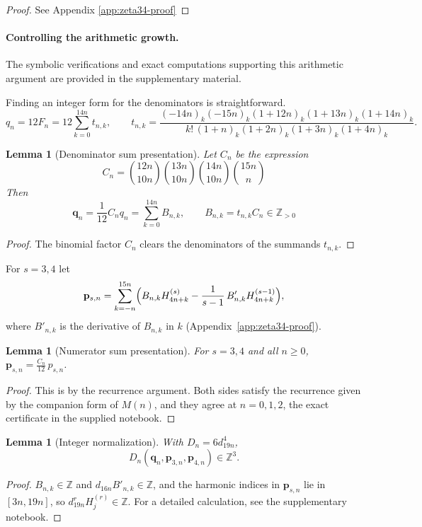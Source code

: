 \documentclass[oneside,english,11pt]{amsart}
\newtheorem{lemma}[thm]{Lemma}
\begin{document}
\begin{proof}
See Appendix \ref{app:zeta34-proof}
\end{proof}
%
\paragraph{Controlling the arithmetic growth.}
\label{par: gcd z34}
The symbolic verifications and exact computations supporting this arithmetic argument are provided in the supplementary material.

Finding an integer form for the denominators is straightforward.
\[
q_n=12F_n = 12\sum_{k=0}^{14n}t_{n,k},\qquad  
t_{n,k}=\frac{(-14n)_k(-15n)_k(1+12n)_k(1+13n)_k(1+14n)_k}{k!\,(1+n)_k(1+2n)_k(1+3n)_k(1+4n)_k}.
\]
\begin{lemma}[Denominator sum presentation]\label{prop:z34-q-iv}
Let $C_n$ be the expression
\[
C_n=\binom{12n}{10n}\binom{13n}{10n}
       \binom{14n}{10n}\binom{15n}{n}
\]
Then
\[
 \mathbf q_n=\frac{1}{12} C_nq_n
 =\sum_{k=0}^{14n}B_{n,k}, \qquad B_{n,k}=t_{n,k}C_{n}\in\mathbb Z_{>0}
\]
\end{lemma}
\begin{proof}
    The binomial factor $C_n$ clears the denominators of the summands $t_{n,k}$.
\end{proof}
For $s=3,4$ let
\begin{equation*}%
  \mathbf p_{s,n}=\sum_{k=-n}^{15n}
  \Bigl(B_{n,k}H^{(s)}_{4n+k}-\frac1{s-1}\,B'_{n,k}H^{(s-1)}_{4n+k}\Bigr),
\end{equation*}
where $B'_{n,k}$ is the derivative of $B_{n,k}$ in $k$
(Appendix~\ref{app:zeta34-proof}).

\begin{lemma}[Numerator sum presentation]\label{prop:z34-p-iv}
For $s=3,4$ and all $n\ge0$, $\mathbf p_{s,n}=\frac{C_n}{12}\,p_{s,n}$.
\end{lemma}

\begin{proof}
This is by the recurrence argument. Both sides satisfy the recurrence given by the companion form of $M(n)$, and they agree at $n=0,1,2$, the exact certificate in the supplied notebook.
\end{proof}

\begin{lemma}[Integer normalization]\label{prop:z34-int} With $D_n=6d_{19n}^4$,
\[
D_n(\mathbf q_n,\mathbf p_{3,n},\mathbf p_{4,n})\in\mathbb Z^3.
\]
\end{lemma}
\begin{proof}
$B_{n,k}\in\mathbb Z$ and $d_{16n}B'_{n,k}\in\mathbb Z$, and the harmonic indices in $\mathbf p_{s,n}$ lie in $[3n,19n]$, so $d_{19n}^rH^{(r)}_j\in\mathbb Z$. For a detailed calculation, see the supplementary notebook.
\end{proof}
\end{document}
